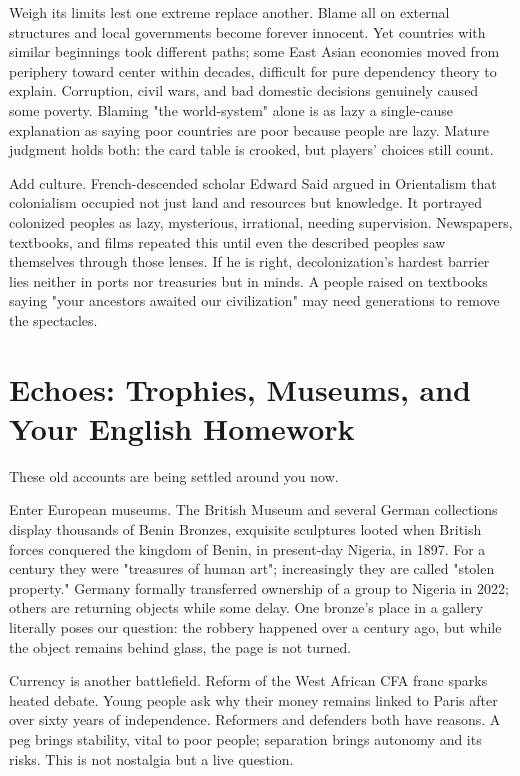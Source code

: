 Weigh its limits lest one extreme replace another. Blame all on external structures and local governments become forever innocent. Yet countries with similar beginnings took different paths; some East Asian economies moved from periphery toward center within decades, difficult for pure dependency theory to explain. Corruption, civil wars, and bad domestic decisions genuinely caused some poverty. Blaming "the world-system" alone is as lazy a single-cause explanation as saying poor countries are poor because people are lazy. Mature judgment holds both: the card table is crooked, but players' choices still count.

Add culture. French-descended scholar Edward Said argued in Orientalism that colonialism occupied not just land and resources but knowledge. It portrayed colonized peoples as lazy, mysterious, irrational, needing supervision. Newspapers, textbooks, and films repeated this until even the described peoples saw themselves through those lenses. If he is right, decolonization's hardest barrier lies neither in ports nor treasuries but in minds. A people raised on textbooks saying "your ancestors awaited our civilization" may need generations to remove the spectacles.

\section{Echoes: Trophies, Museums, and Your English Homework}
These old accounts are being settled around you now.

Enter European museums. The British Museum and several German collections display thousands of Benin Bronzes, exquisite sculptures looted when British forces conquered the kingdom of Benin, in present-day Nigeria, in 1897. For a century they were "treasures of human art"; increasingly they are called "stolen property." Germany formally transferred ownership of a group to Nigeria in 2022; others are returning objects while some delay. One bronze's place in a gallery literally poses our question: the robbery happened over a century ago, but while the object remains behind glass, the page is not turned.

Currency is another battlefield. Reform of the West African CFA franc sparks heated debate. Young people ask why their money remains linked to Paris after over sixty years of independence. Reformers and defenders both have reasons. A peg brings stability, vital to poor people; separation brings autonomy and its risks. This is not nostalgia but a live question.

